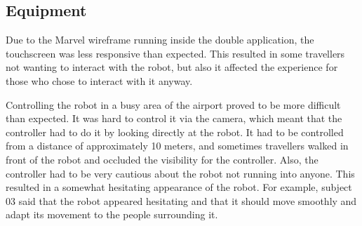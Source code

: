 \subsection{Equipment}
Due to the Marvel wireframe running inside the double application, the touchscreen was less responsive than expected. This resulted in some travellers not wanting to interact with the robot, but also it affected the experience for those who chose to interact with it anyway.

Controlling the robot in a busy area of the airport proved to be more difficult than expected. It was hard to control it via the camera, which meant that the controller had to do it by looking directly at the robot. It had to be controlled from a distance of approximately 10 meters, and sometimes travellers walked in front of the robot and occluded the visibility for the controller. Also, the controller had to be very cautious about the robot not running into anyone. This resulted in a somewhat hesitating appearance of the robot. For example, subject 03 said that the robot appeared hesitating and that it should move smoothly and adapt its movement to the people surrounding it.